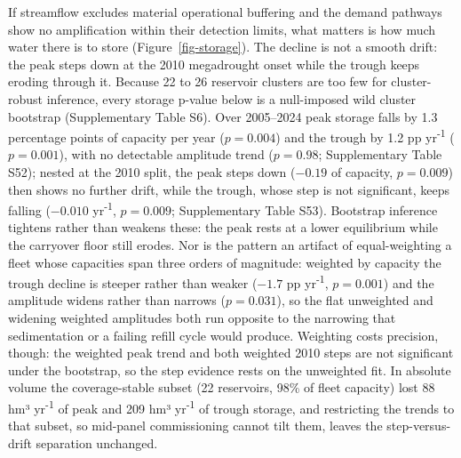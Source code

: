 \documentclass[
]{agujournal2019}
\begin{document}
If streamflow excludes material operational buffering and the demand
pathways show no amplification within their detection limits, what
matters is how much water there is to store (Figure~\ref{fig-storage}).
The decline is not a smooth drift: the peak steps down at the 2010
megadrought onset while the trough keeps eroding through it. Because 22
to 26 reservoir clusters are too few for cluster-robust inference, every
storage p-value below is a null-imposed wild cluster bootstrap
(Supplementary Table S6). Over 2005--2024 peak storage falls by 1.3
percentage points of capacity per year (\(p = 0.004\)) and the trough by
1.2 pp yr\textsuperscript{-1} (\(p = 0.001\)), with no detectable
amplitude trend (\(p = 0.98\); Supplementary Table S52); nested at the
2010 split, the peak steps down (\(-0.19\) of capacity, \(p = 0.009\))
then shows no further drift, while the trough, whose step is not
significant, keeps falling (\(-0.010\) yr\textsuperscript{-1},
\(p = 0.009\); Supplementary Table S53). Bootstrap inference tightens
rather than weakens these: the peak rests at a lower equilibrium while
the carryover floor still erodes. Nor is the pattern an artifact of
equal-weighting a fleet whose capacities span three orders of magnitude:
weighted by capacity the trough decline is steeper rather than weaker
(\(-1.7\) pp yr\textsuperscript{-1}, \(p = 0.001\)) and the amplitude
widens rather than narrows (\(p = 0.031\)), so the flat unweighted and
widening weighted amplitudes both run opposite to the narrowing that
sedimentation or a failing refill cycle would produce. Weighting costs
precision, though: the weighted peak trend and both weighted 2010 steps
are not significant under the bootstrap, so the step evidence rests on
the unweighted fit. In absolute volume the coverage-stable subset (22
reservoirs, 98\% of fleet capacity) lost 88 hm³ yr\textsuperscript{-1}
of peak and 209 hm³ yr\textsuperscript{-1} of trough storage, and
restricting the trends to that subset, so mid-panel commissioning cannot
tilt them, leaves the step-versus-drift separation unchanged.
\end{document}
